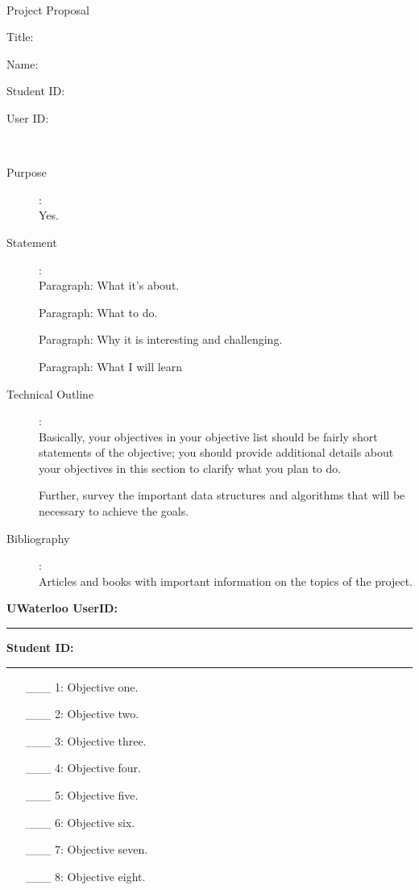 \documentclass {article}
\begin{document}
~\vfill
\begin{center}
\Large

Project Proposal

Title:

Name: 

Student ID:

User ID:
\end{center}
\vfill ~\vfill~
\newpage
{}
\begin{description}
\item[Purpose]:\\
	Yes.

\item[Statement]:\\
	Paragraph: What it's about.

	Paragraph: What to do.

	Paragraph: Why it is interesting and challenging.

	Paragraph: What I will learn

\item[Technical Outline]:\\
	Basically, your objectives in your objective list should be fairly short statements of the objective; you should provide additional details about your objectives in this section to clarify what you plan to do.

	Further, survey the important data structures and algorithms that will be necessary to achieve the goals.

\item[Bibliography]:\\
	Articles and books with important information on the topics of the project.

\end{description}
\newpage



{\hfill{\bf UWaterloo UserID:\rule{2in}{.1mm}}\hfill{\bf Student ID:\rule{2in}{.1mm}}\hfill}

\begin{enumerate}
     \item[\_\_\_ 1:]  Objective one.

     \item[\_\_\_ 2:]  Objective two.

     \item[\_\_\_ 3:]  Objective three.

     \item[\_\_\_ 4:]  Objective four.

     \item[\_\_\_ 5:]  Objective five.

     \item[\_\_\_ 6:]  Objective six.

     \item[\_\_\_ 7:]  Objective seven.

     \item[\_\_\_ 8:]  Objective eight.
\end{enumerate}

\end{document}
